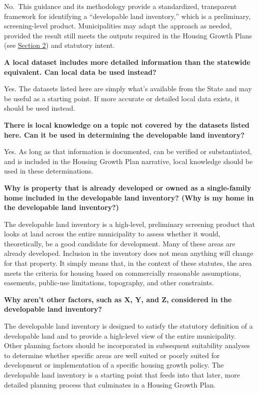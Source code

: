\documentclass[
  letterpaper,
  DIV=11,
  numbers=noendperiod]{scrreprt}
\begin{document}
No.~This guidance and its methodology provide a standardized,
transparent framework for identifying a ``developable land inventory,''
which is a preliminary, screening-level product. Municipalities may
adapt the approach as needed, provided the result still meets the
outputs required in the Housing Growth Plans (see
\hyperref[use-of-this-analysis-1]{Section 2}) and statutory intent.

\textbf{A local dataset includes more detailed information than the
statewide equivalent. Can local data be used instead?}

Yes. The datasets listed here are simply what's available from the State
and may be useful as a starting point. If more accurate or detailed
local data exists, it should be used instead.

\textbf{There is local knowledge on a topic not covered by the datasets
listed here. Can it be used in determining the developable land
inventory?}

Yes. As long as that information is documented, can be verified or
substantiated, and is included in the Housing Growth Plan narrative,
local knowledge should be used in these determinations.

\textbf{Why is property that is already developed or owned as a
single-family home included in the developable land inventory? (Why is
my home in the developable land inventory?)}

The developable land inventory is a high-level, preliminary screening
product that looks at land across the entire municipality to assess
whether it would, theoretically, be a good candidate for development.
Many of these areas are already developed. Inclusion in the inventory
does not mean anything will change for that property. It simply means
that, in the context of these statutes, the area meets the criteria for
housing based on commercially reasonable assumptions, easements,
public-use limitations, topography, and other constraints.

\textbf{Why aren't other factors, such as X, Y, and Z, considered in the
developable land inventory?}

The developable land inventory is designed to satisfy the statutory
definition of a developable land and to provide a high-level view of the
entire municipality. Other planning factors should be incorporated in
subsequent suitability analyses to determine whether specific areas are
well suited or poorly suited for development or implementation of a
specific housing growth policy. The developable land inventory is a
starting point that feeds into that later, more detailed planning
process that culminates in a Housing Growth Plan.
\end{document}
